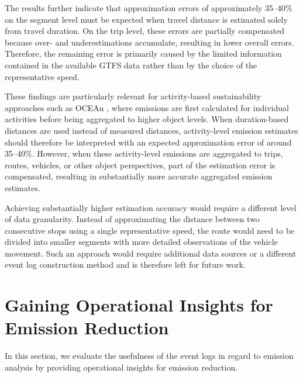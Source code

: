 The results further indicate that approximation errors of approximately 35--40\% on the segment level must be expected when travel distance is estimated solely from travel duration. On the trip level, these errors are partially compensated because over- and underestimations accumulate, resulting in lower overall errors. Therefore, the remaining error is primarily caused by the limited information contained in the available GTFS data rather than by the choice of the representative speed.

These findings are particularly relevant for activity-based sustainability approaches such as OCEAn \cite{ocean}, where emissions are first calculated for individual activities before being aggregated to higher object levels. When duration-based distances are used instead of measured distances, activity-level emission estimates should therefore be interpreted with an expected approximation error of around 35--40\%. However, when these activity-level emissions are aggregated to trips, routes, vehicles, or other object perspectives, part of the estimation error is compensated, resulting in substantially more accurate aggregated emission estimates.

Achieving substantially higher estimation accuracy would require a different level of data granularity. Instead of approximating the distance between two consecutive stops using a single representative speed, the route would need to be divided into smaller segments with more detailed observations of the vehicle movement. Such an approach would require additional data sources or a different event log construction method and is therefore left for future work.




\section{Gaining Operational Insights for Emission Reduction}


In this section, we evaluate the usefulness of the event logs in regard to emission analysis by providing operational insights for emission reduction. 

